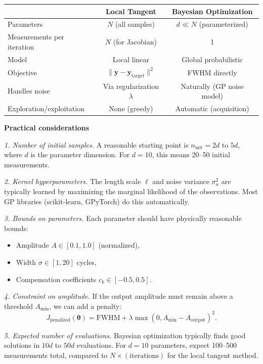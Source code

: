 \documentclass[11pt]{article}
\begin{document}
\begin{center}
\begin{tabular}{l|c|c}
& \textbf{Local Tangent} & \textbf{Bayesian Optimization} \\
\hline
Parameters & $N$ (all samples) & $d \ll N$ (parameterized) \\
Measurements per iteration & $N$ (for Jacobian) & 1 \\
Model & Local linear & Global probabilistic \\
Objective & $\|\mathbf{y} - \mathbf{y}_{\text{target}}\|^2$ & FWHM directly \\
Handles noise & Via regularization $\lambda$ & Naturally (GP noise model) \\
Exploration/exploitation & None (greedy) & Automatic (acquisition) \\
\end{tabular}
\end{center}

\vspace{1em}
\begin{center}
\textbf{Practical considerations}
\end{center}

\textit{1. Number of initial samples.}
A reasonable starting point is $n_{\text{init}} = 2d$ to $5d$, where $d$ is the parameter dimension.
For $d = 10$, this means 20--50 initial measurements.

\textit{2. Kernel hyperparameters.}
The length scale $\ell$ and noise variance $\sigma_n^2$ are typically learned by maximizing the marginal likelihood of the observations.
Most GP libraries (scikit-learn, GPyTorch) do this automatically.

\textit{3. Bounds on parameters.}
Each parameter should have physically reasonable bounds:
\begin{itemize}[nosep]
    \item Amplitude $A \in [0.1, 1.0]$ (normalized),
    \item Width $\sigma \in [1, 20]$ cycles,
    \item Compensation coefficients $c_k \in [-0.5, 0.5]$.
\end{itemize}

\textit{4. Constraint on amplitude.}
If the output amplitude must remain above a threshold $A_{\min}$, we can add a penalty:
\[
J_{\text{penalized}}(\bm{\theta}) = \text{FWHM} + \lambda \max(0, A_{\min} - A_{\text{output}})^2.
\]

\textit{5. Expected number of evaluations.}
Bayesian optimization typically finds good solutions in $10d$ to $50d$ evaluations.
For $d = 10$ parameters, expect 100--500 measurements total, compared to $N \times (\text{iterations})$ for the local tangent method.
\end{document}
